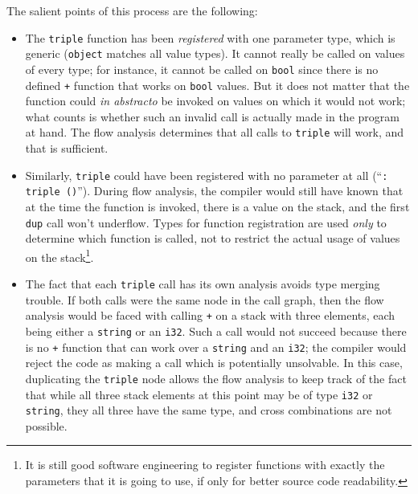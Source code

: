 The salient points of this process are the following:
\begin{itemize}

    \item The \verb|triple| function has been \emph{registered} with one
    parameter type, which is generic (\verb|object| matches all value
    types). It cannot really be called on values of every type; for
    instance, it cannot be called on \verb|bool| since there is no
    defined \verb|+| function that works on \verb|bool| values. But it
    does not matter that the function could \emph{in abstracto} be
    invoked on values on which it would not work; what counts is whether
    such an invalid call is actually made in the program at hand. The
    flow analysis determines that all calls to \verb|triple| will work,
    and that is sufficient.

    \item Similarly, \verb|triple| could have been registered with no
    parameter at all (``\verb|: triple ()|''). During flow analysis, the
    compiler would still have known that at the time the function is
    invoked, there is a value on the stack, and the first \verb|dup|
    call won't underflow. Types for function registration are used
    \emph{only} to determine which function is called, not to restrict
    the actual usage of values on the stack\footnote{It is still good
    software engineering to register functions with exactly the
    parameters that it is going to use, if only for better source code
    readability.}.

    \item The fact that each \verb|triple| call has its own analysis
    avoids type merging trouble. If both calls were the same node in the
    call graph, then the flow analysis would be faced with calling
    \verb|+| on a stack with three elements, each being either a
    \verb|string| or an \verb|i32|. Such a call would not succeed
    because there is no \verb|+| function that can work over a
    \verb|string| and an \verb|i32|; the compiler would reject the code
    as making a call which is potentially unsolvable. In this case,
    duplicating the \verb|triple| node allows the flow analysis to keep
    track of the fact that while all three stack elements at this point
    may be of type \verb|i32| or \verb|string|, they all three have the
    same type, and cross combinations are not possible.

\end{itemize}

